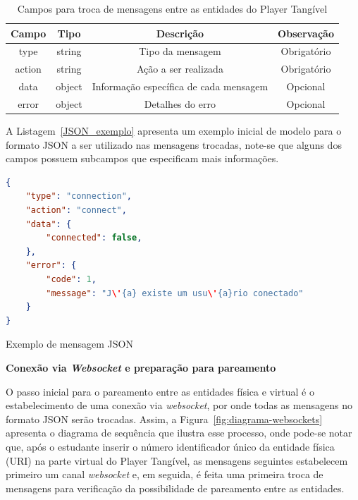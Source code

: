 \begin{table}[htb]
	\caption{Campos para troca de mensagens entre as entidades do Player Tangível}
	\centering
	\begin{tabular}{|c|c|c|c|}
		\hline
		\rowcolor[HTML]{C0C0C0} 
		\textbf{Campo} & \textbf{Tipo} & \textbf{Descrição} & \textbf{Observação} \\ \hline
		type & string & Tipo da mensagem & Obrigatório \\ \hline
		action & string & Ação a ser realizada & Obrigatório \\ \hline
		data & object & Informação específica de cada mensagem & Opcional \\ \hline
		error & object & Detalhes do erro & Opcional \\ \hline
	\end{tabular}
	\label{tabela:JSON}
\end{table}

A Listagem~\ref{JSON_exemplo} apresenta um exemplo inicial de modelo para o formato JSON a ser utilizado nas mensagens trocadas, note-se que alguns dos campos possuem subcampos que especificam mais informações.

\begin{listing}[htb]
\begin{lstlisting}[language=json,firstnumber=1]
{
	"type": "connection",
	"action": "connect",
	"data": {
		"connected": false,
	},
	"error": {
		"code": 1,
		"message": "J\'{a} existe um usu\'{a}rio conectado"
	}
}
\end{lstlisting}
\caption{Exemplo de mensagem JSON}
\label{JSON_exemplo}
\end{listing}
\textbf{Conexão via \textit{Websocket} e preparação para pareamento}

O passo inicial para o pareamento entre as entidades física e virtual é o estabelecimento de uma conexão via \textit{websocket}, por onde todas as mensagens no formato JSON serão trocadas. Assim, a Figura~\ref{fig:diagrama-websockets} apresenta o diagrama de sequência que ilustra esse processo, onde pode-se notar que, após o estudante inserir o número identificador único da entidade física (URI) na parte virtual do Player Tangível, as mensagens seguintes estabelecem primeiro um canal \textit{websocket} e, em seguida, é feita uma primeira troca de mensagens para verificação da possibilidade de pareamento entre as entidades.

